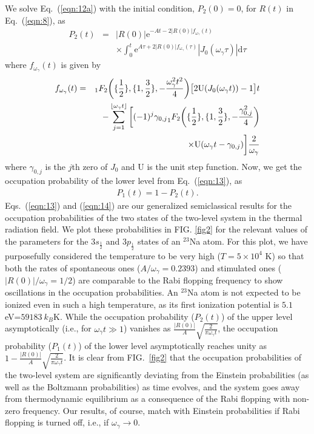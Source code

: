 \documentclass[aps,pra,twocolumn,showpacs,preprintnumbers,amsmath,amssymb,footinbib]{revtex4}
\DeclarePairedDelimiter{\floor}{\lfloor}{\rfloor}
\begin{document}
We solve Eq.~(\ref{eqn:12a}) with the initial condition, $P_2(0)=0$, for $R(t)$ in Eq.~(\ref{eqn:8}), as
\begin{eqnarray}\label{eqn:13}
P_2(t)&=&|R(0)|\text{e}^{-At-2|R(0)|f_{\omega_\gamma}(t)}\nonumber\\&&\times\int_0^t\text{e}^{A\tau+2|R(0)|f_{\omega_\gamma}(\tau)}|J_0(\omega_\gamma\tau)|\text{d}\tau
\end{eqnarray}
where $f_{\omega_\gamma}(t)$ is given by
\begin{eqnarray}\label{eqn:13x}
f_{\omega_\gamma}(t)&=& _1F_2\bigg(\{\frac{1}{2}\}, \{1,\frac{3}{2}\}, -\frac{\omega_\gamma^2 t^2}{4}\bigg)\big[2\text{U}(J_0(\omega_\gamma t))-1\big]t\nonumber\\&&-\sum_{j=1}^{\floor*{\omega_\gamma t}}\bigg[(-1)^j{\gamma_{0,j}} _1F_2\bigg(\{\frac{1}{2}\}, \{1,\frac{3}{2}\}, -\frac{\gamma_{0,j}^2}{4}\bigg)\nonumber\\&&\times\text{U}(\omega_\gamma t-\gamma_{0,j})\bigg]\frac{2}{\omega_\gamma}
\end{eqnarray}
where $\gamma_{0,j}$ is the $j$th zero of $J_0$ and $\text{U}$ is the unit step function. Now, we get the occupation probability of the lower level from Eq.~(\ref{eqn:13}), as
\begin{eqnarray}\label{eqn:14}
P_1(t)=1-P_2(t).
\end{eqnarray}
Eqs.~(\ref{eqn:13}) and (\ref{eqn:14}) are our generalized semiclassical results for the occupation probabilities of the two states of the two-level system in the thermal radiation field. We plot these probabilities in FIG. \ref{fig2} for the relevant values of the parameters for the $3s_{\frac{1}{2}}$ and $3p_{\frac{1}{2}}$ states of an $^{23}$Na atom. For this plot, we have purposefully considered the temperature to be very high ($T=5\times10^4$ K) so that both the rates of spontaneous ones ($A/\omega_\gamma=0.2393$) and stimulated ones ($|R(0)|/\omega_\gamma=1/2$) are comparable to the Rabi flopping frequency to show oscillations in the occupation probabilities. An $^{23}$Na atom is not expected to be ionized even in such a high temperature, as its first ionization potential is $5.1~$eV=$59183~k_B$K. While the occupation probability ($P_2(t)$) of the upper level asymptotically (i.e., for $\omega_\gamma t\gg1$) vanishes as $\frac{|R(0)|}{A}\sqrt{\frac{2}{\pi\omega_\gamma t}}$, the occupation probability ($P_1(t)$) of the lower level asymptotically reaches unity as $1-\frac{|R(0)|}{A}\sqrt{\frac{2}{\pi\omega_\gamma t}}$. It is clear from FIG.~\ref{fig2} that the occupation probabilities of the two-level system are significantly deviating from the Einstein probabilities (as well as the Boltzmann probabilities) as time evolves, and the system goes away from thermodynamic equilibrium as a consequence of the Rabi flopping with non-zero frequency. Our results, of course, match with Einstein probabilities if Rabi flopping is turned off, i.e., if $\omega_\gamma\rightarrow0$.
\end{document}
